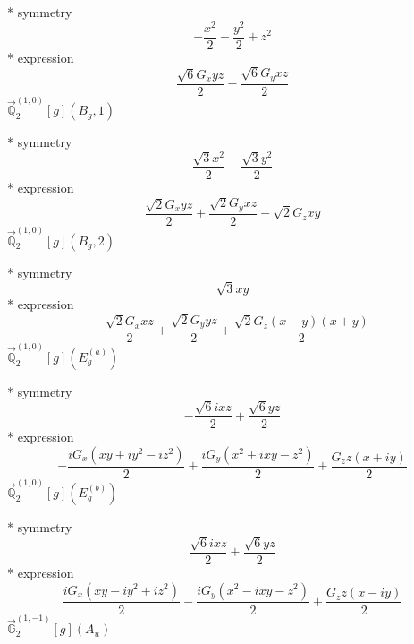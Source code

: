 \documentclass[fleqn,8pt]{jsarticle}
\begin{document}
\noindent\quad ** symmetry
\begin{dmath*}
- \frac{x^{2}}{2} - \frac{y^{2}}{2} + z^{2}
\end{dmath*}
\noindent\quad ** expression
\begin{dmath*}
\frac{\sqrt{6} G_{x} y z}{2} - \frac{\sqrt{6} G_{y} x z}{2}
\end{dmath*}
\noindent\quad $\vec{\mathbb{Q}}_{2}^{(1,0)}[g](B_{g},1)$

\noindent\quad ** symmetry
\begin{dmath*}
\frac{\sqrt{3} x^{2}}{2} - \frac{\sqrt{3} y^{2}}{2}
\end{dmath*}
\noindent\quad ** expression
\begin{dmath*}
\frac{\sqrt{2} G_{x} y z}{2} + \frac{\sqrt{2} G_{y} x z}{2} - \sqrt{2} G_{z} x y
\end{dmath*}
\noindent\quad $\vec{\mathbb{Q}}_{2}^{(1,0)}[g](B_{g},2)$

\noindent\quad ** symmetry
\begin{dmath*}
\sqrt{3} x y
\end{dmath*}
\noindent\quad ** expression
\begin{dmath*}
- \frac{\sqrt{2} G_{x} x z}{2} + \frac{\sqrt{2} G_{y} y z}{2} + \frac{\sqrt{2} G_{z} \left(x - y\right) \left(x + y\right)}{2}
\end{dmath*}
\noindent\quad $\vec{\mathbb{Q}}_{2}^{(1,0)}[g](E_{g}^{(a)})$

\noindent\quad ** symmetry
\begin{dmath*}
- \frac{\sqrt{6} i x z}{2} + \frac{\sqrt{6} y z}{2}
\end{dmath*}
\noindent\quad ** expression
\begin{dmath*}
- \frac{i G_{x} \left(x y + i y^{2} - i z^{2}\right)}{2} + \frac{i G_{y} \left(x^{2} + i x y - z^{2}\right)}{2} + \frac{G_{z} z \left(x + i y\right)}{2}
\end{dmath*}
\noindent\quad $\vec{\mathbb{Q}}_{2}^{(1,0)}[g](E_{g}^{(b)})$

\noindent\quad ** symmetry
\begin{dmath*}
\frac{\sqrt{6} i x z}{2} + \frac{\sqrt{6} y z}{2}
\end{dmath*}
\noindent\quad ** expression
\begin{dmath*}
\frac{i G_{x} \left(x y - i y^{2} + i z^{2}\right)}{2} - \frac{i G_{y} \left(x^{2} - i x y - z^{2}\right)}{2} + \frac{G_{z} z \left(x - i y\right)}{2}
\end{dmath*}
\noindent\quad $\vec{\mathbb{G}}_{2}^{(1,-1)}[g](A_{u})$
\end{document}

